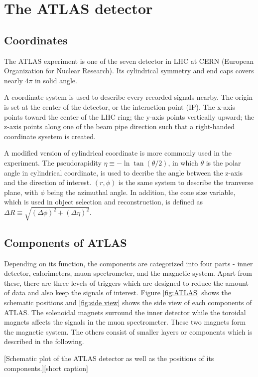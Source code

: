 \documentclass[class=NCU_thesis, crop=false]{standalone}
\begin{document}
\chapter{The ATLAS detector}\label{ATLAS}
\section{Coordinates}
	The ATLAS experiment \cite{1748-0221-3-08-S08003} is one of the seven detector in LHC at CERN (European Organization for Nuclear Research). Its cylindrical symmetry and end caps covers nearly $4\pi$ in solid angle.
	
	A coordinate system is used to describe every recorded signals nearby. The origin is set at the center of the detector, or the interaction point (IP). The x-axis points toward the center of the LHC ring; the y-axis points vertically upward; the z-axis points along one of the beam pipe direction such that a right-handed coordinate sysetem is created.
	
	A modified version of cylindrical coordinate is more commonly used in the experiment. The pseudorapidity $\eta \equiv -\ln\tan(\theta / 2)$, in which $\theta$ is the polar angle in cylindrical coordinate, is used to decribe the angle between the z-axis and the direction of interest. $(r, \phi)$ is the same system to describe the tranverse plane, with $\phi$ being the azimuthal angle. In addition, the cone size variable, which is used in object selection and reconstruction, is defined as $\Delta R \equiv \sqrt{(\Delta \phi)^2 + (\Delta \eta)^2}$.

\section{Components of ATLAS}
	Depending on its function, the components are categorized into four parts - inner detector, calorimeters, muon spectrometer, and the magnetic system. Apart from these, there are three levels of triggers which are designed to reduce the amount of data and also keep the signals of interest. Figure \ref{fig:ATLAS} shows the schematic positions and \ref{fig:side view} shows the side view of each components of ATLAS. The solenoidal magnets surround the inner detector while the toroidal magnets affects the signals in the muon spectrometer. These two magnets form the magnetic system. The others consist of smaller layers or components which is described in the following.
	
	[Schematic plot of the ATLAS detector as well as the positions of its components.][short caption]
	
\end{document}
